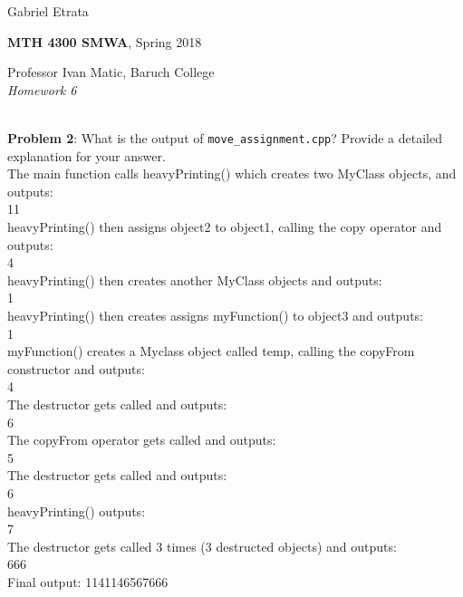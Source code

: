 \documentclass[12pt]{article}
\begin{document}
	\raggedright{Gabriel Etrata} \hfill {}\\
	\raggedright{\textbf{MTH 4300 SMWA}, Spring 2018}\\%
	\raggedright{Professor Ivan Matic, Baruch College}\\
	\textit{Homework 6} \\%
	\hrulefill\\
	\setlength\parindent{24pt} 

\textbf{Problem 2}: What is the output of \texttt{move\_assignment.cpp}? Provide a detailed explanation for your answer. \\
The main function calls heavyPrinting() which creates two MyClass objects, and outputs:\\
11\\
heavyPrinting() then assigns object2 to object1, calling the copy operator and outputs:\\
4\\
heavyPrinting() then creates another MyClass objects and outputs:\\
1\\
heavyPrinting() then creates assigns myFunction() to object3 and outputs:\\
1\\
myFunction() creates a Myclass object called temp, calling the copyFrom constructor and outputs:\\
4\\
The destructor gets called and outputs:\\
6\\
The copyFrom operator gets called and outputs:\\
5\\
The destructor gets called and outputs:\\
6\\
heavyPrinting() outputs:\\
7\\
The destructor gets called 3 times (3 destructed objects) and outputs:\\
666\\
Final output: 1141146567666


	
\end{document}
